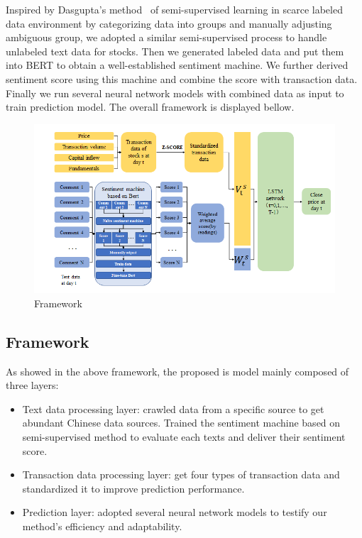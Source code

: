 \documentclass[runningheads]{llncs}
\begin{document}
Inspired by Dasgupta's method~\cite{semi-supervised} of semi-supervised learning in scarce labeled data environment by categorizing data into groups and manually adjusting ambiguous group, we adopted a similar semi-supervised process to handle unlabeled text data for stocks. Then we generated labeled data and put them into BERT to obtain a well-established sentiment machine. We further derived sentiment score using this machine and combine the score with transaction data. Finally we run several neural network models with combined data as input to train prediction model. The overall framework is displayed bellow.
\begin{figure}
\includegraphics[width=\textwidth]{model-en.png}
\caption{Framework} \label{fig1}
\end{figure}

\subsection{Framework}
As showed in the above framework, the proposed is model mainly composed of three layers:
\begin{itemize}
    \item Text data processing layer: crawled data from a specific source to get abundant Chinese data sources. Trained the sentiment machine based on semi-supervised method to evaluate each texts and deliver their sentiment score.
    \item Transaction data processing layer: get four types of transaction data and standardized it to improve prediction performance.
    \item Prediction layer: adopted several neural network models to testify our method's efficiency and adaptability. 
\end{itemize}
\end{document}
